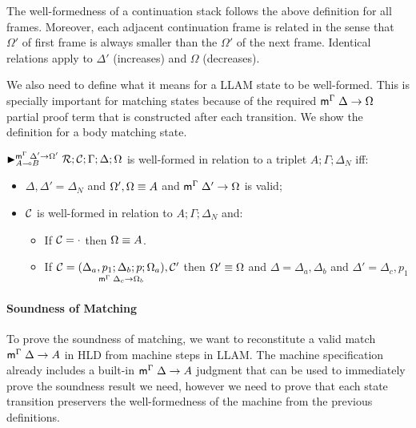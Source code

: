 The well-formedness of a continuation stack follows the above definition for all
frames.  Moreover, each adjacent continuation frame is related in the sense that
$\Omega'$ of first frame is always smaller than the $\Omega'$ of the next frame.
Identical relations apply to $\Delta'$ (increases) and $\Omega$ (decreases).

We also need to define what it means for a LLAM state to be well-formed. This is
specially important for matching states because of the required
$\mz{\Gamma}{\Delta}{\Omega}$ partial proof term that is constructed after each
transition. We show the definition for a body matching state.

\begin{definition}
  $\matstate{A \lolli B}{\rulestk}{\lstack{C}}{\Gamma}{\Delta}{\Omega}{\Delta'
  \rightarrow \Omega'}$ is well-formed in relation to a triplet $A; \Gamma;
  \Delta_{N}$ iff:

  \begin{itemize}
     \item $\Delta, \Delta' = \Delta_{N}$ and $\feq{\Omega', \Omega}{A}$ and $\mz{\Gamma}{\Delta'}{\Omega}$ is valid;
     \item $\lstack{C}$ is well-formed in relation to $A; \Gamma; \Delta_{N}$ and:
     \begin{itemize}
        \item If $\lstack{C} = \cdot$ then $\feq{\Omega}{A}$.

        \item If $\lstack{C} = \lframe{\Delta_a,
     p_1}{\Delta_b}{p}{\Omega_a}{\Delta_c}{\Omega_b}, \lstack{C'}$ then $\feq{\Omega'}{\Omega}$ and $\Delta = \Delta_a, \Delta_b$ and $\Delta' = \Delta_c, p_1$
      \end{itemize}
   \end{itemize}
\end{definition}

\paragraph{Soundness of Matching} To prove the soundness of matching, we want
to reconstitute a valid match $\mz{\Gamma}{\Delta}{A}$ in HLD from machine
steps in LLAM. The machine specification already includes a built-in
$\mz{\Gamma}{\Delta}{A}$ judgment that can be used to immediately prove the
soundness result we need, however we need to prove that each state transition
preservers the well-formedness of the machine from the previous definitions.

